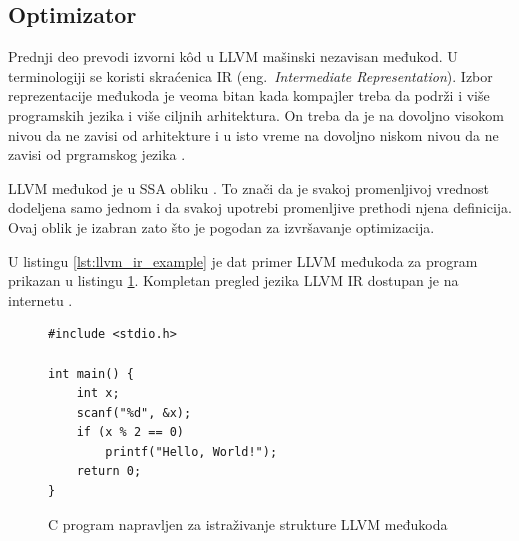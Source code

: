 \documentclass[12pt,oneside]{memoir}
\begin{document}
\subsection{Optimizator}


Prednji deo prevodi izvorni k\^od u LLVM mašinski nezavisan međukod.
U terminologiji se koristi skraćenica IR (eng.~{\em Intermediate Representation}).
Izbor reprezentacije međukoda je veoma bitan kada kompajler treba da podrži i više programskih jezika i više ciljnih arhitektura.
On treba da je na dovoljno visokom nivou da ne zavisi od arhitekture i u isto vreme na dovoljno niskom nivou da ne zavisi od prgramskog jezika \cite{sarda2015llvm_essentials}.

LLVM međukod je u SSA obliku \cite{rastello2022ssa}.
To znači da je svakoj promenljivoj vrednost dodeljena samo jednom i da svakoj upotrebi promenljive prethodi njena definicija.
Ovaj oblik je izabran zato što je pogodan za izvršavanje optimizacija.

U listingu \ref{lst:llvm_ir_example} je dat primer LLVM međukoda za program prikazan u listingu \ref{lst:ir_c_example}.
Kompletan pregled jezika LLVM IR dostupan je na internetu \cite{llvmlangref}.

\begin{figure}[!ht]
\begin{verbatim}
#include <stdio.h>

int main() {
	int x;
	scanf("%d", &x);
	if (x % 2 == 0)
		printf("Hello, World!");
	return 0;
}
\end{verbatim}
\caption{C program napravljen za istraživanje strukture LLVM međukoda}
\label{lst:ir_c_example}
\end{figure}
\end{document}
